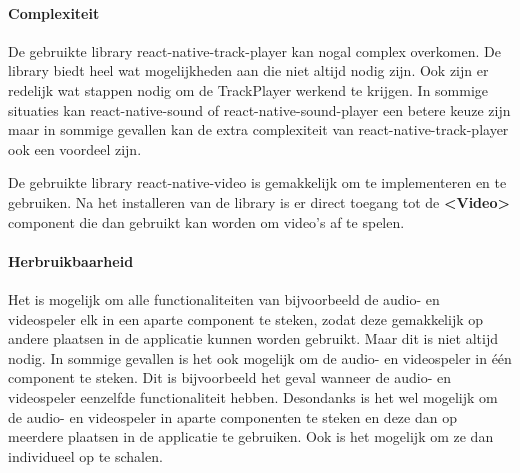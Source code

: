 \paragraph{Complexiteit}
De gebruikte library react-native-track-player kan nogal complex overkomen. De library 
biedt heel wat mogelijkheden aan die niet altijd nodig zijn. Ook zijn er redelijk wat stappen 
nodig om de TrackPlayer werkend te krijgen. In sommige situaties kan 
react-native-sound of react-native-sound-player een betere keuze zijn maar in sommige gevallen kan 
de extra complexiteit van react-native-track-player ook een voordeel zijn. 

De gebruikte library react-native-video is gemakkelijk om te implementeren en te gebruiken.
Na het installeren van de library is er direct toegang tot de \textbf{<Video>} component
die dan gebruikt kan worden om video's af te spelen.

\paragraph{Herbruikbaarheid}
Het is mogelijk om alle functionaliteiten van bijvoorbeeld de audio- en videospeler elk in een 
aparte component te steken, zodat deze gemakkelijk op andere plaatsen in de applicatie kunnen worden 
gebruikt. Maar dit is niet altijd
nodig. In sommige gevallen is het ook mogelijk om de audio- en videospeler in één component
te steken. Dit is bijvoorbeeld het geval wanneer de audio- en videospeler eenzelfde functionaliteit
hebben. Desondanks is het wel mogelijk om de audio- en videospeler in aparte componenten te steken
en deze dan op meerdere plaatsen in de applicatie te gebruiken. Ook is het mogelijk om ze dan 
individueel op te schalen.
